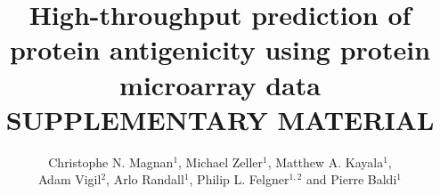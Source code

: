 \documentclass{bioinfo}
\begin{document}
\title[Prediction of protein antigenicity]{High-throughput prediction of protein antigenicity using protein microarray data\\\vspace{0.5cm}SUPPLEMENTARY MATERIAL\\\vspace{0.5cm}}
\author[C.N. Magnan \textit{et al}]{Christophe N. Magnan$^1$, Michael Zeller$^1$, Matthew A. Kayala$^1$,\\
Adam Vigil$^2$, Arlo Randall$^1$, Philip L. Felgner$^{1,2}$ and Pierre Baldi$^1$}
\address{$^1$Institute for Genomics and Bioinformatics, School of Information and Computer Sciences and\\
$^2$Department of Medicine, Division of Infectious Diseases. University of California, Irvine, CA, USA.}
\onecolumn
\maketitle

\newcommand{\dataset}[1]{\textbf{\texttt{#1}}}
\newcommand{\up}[1]{\texttt{#1}}
\end{document}
